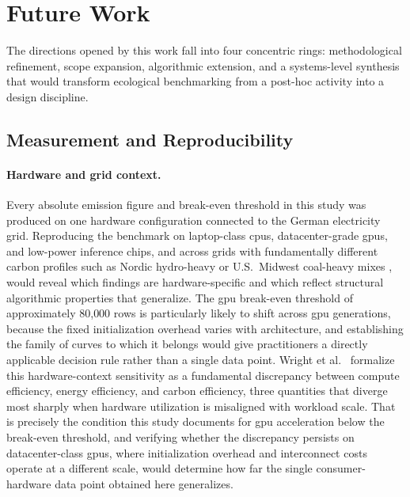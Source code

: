 \section{Future Work}
\label{sec:future_work}

The directions opened by this work fall into four concentric rings: methodological refinement, scope expansion, algorithmic extension, and a systems-level synthesis that would transform ecological benchmarking from a post-hoc activity into a design discipline.

\subsection{Measurement and Reproducibility}

\paragraph{Hardware and grid context.}
Every absolute emission figure and break-even threshold in this study was produced on one hardware configuration connected to the German electricity grid. Reproducing the benchmark on laptop-class \glspl{cpu}, datacenter-grade \glspl{gpu}, and low-power inference chips, and across grids with fundamentally different carbon profiles such as Nordic hydro-heavy or U.S.\ Midwest coal-heavy mixes \cite{dodgeMeasuringCarbonIntensity2022}, would reveal which findings are hardware-specific and which reflect structural algorithmic properties that generalize. The \gls{gpu} break-even threshold of approximately 80{,}000 rows is particularly likely to shift across \gls{gpu} generations, because the fixed initialization overhead varies with architecture, and establishing the family of curves to which it belongs would give practitioners a directly applicable decision rule rather than a single data point. Wright et al.\ \parencite{wrightEfficiencyNotEnough2025} formalize this hardware-context sensitivity as a fundamental discrepancy between compute efficiency, energy efficiency, and carbon efficiency, three quantities that diverge most sharply when hardware utilization is misaligned with workload scale. That is precisely the condition this study documents for \gls{gpu} acceleration below the break-even threshold, and verifying whether the discrepancy persists on datacenter-class \glspl{gpu}, where initialization overhead and interconnect costs operate at a different scale, would determine how far the single consumer-hardware data point obtained here generalizes.

